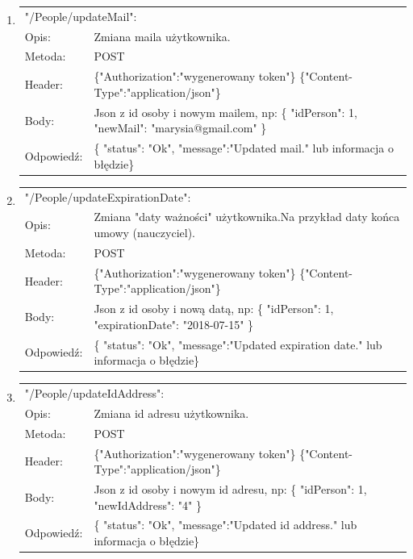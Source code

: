 \documentclass[12pt, titlepage]{article}
\begin{document}
\begin{enumerate}
	\item
	{\renewcommand{\arraystretch}{1.5}
	\begin{tabular}[t]{p{3cm} p{15cm}}
	\multicolumn{2}{l}{"/People/updateMail":} \\
	Opis: & Zmiana maila użytkownika. \\
	Metoda: & POST \\
	Header: & \{"Authorization":"wygenerowany token"\} \newline \{"Content-Type":"application/json"\} \\
	Body: & Json z id osoby i nowym mailem, np: \newline
	\{
	"idPerson": 1,\newline
	"newMail": "marysia@gmail.com"
\}\\
	Odpowiedź: & \{
    "status": "Ok",\newline
    "message":"Updated mail." lub informacja o błędzie\} 
	\end{tabular}}
	
	\item
	{\renewcommand{\arraystretch}{1.5}
	\begin{tabular}[t]{p{3cm} p{15cm}}
	\multicolumn{2}{l}{"/People/updateExpirationDate":} \\
	Opis: & Zmiana "daty ważności" użytkownika.\newline Na przykład daty końca umowy (nauczyciel). \\
	Metoda: & POST \\
	Header: & \{"Authorization":"wygenerowany token"\} \newline \{"Content-Type":"application/json"\} \\
	Body: & Json z id osoby i nową datą, np: \newline
	\{
	"idPerson": 1,\newline
	"expirationDate": "2018-07-15"
\}\\
	Odpowiedź: & \{
    "status": "Ok",\newline
    "message":"Updated expiration date." lub informacja o błędzie\} 
	\end{tabular}}
	
	\item
	{\renewcommand{\arraystretch}{1.5}
	\begin{tabular}[t]{p{3cm} p{15cm}}
	\multicolumn{2}{l}{"/People/updateIdAddress":} \\
	Opis: & Zmiana id adresu użytkownika. \\
	Metoda: & POST \\
	Header: & \{"Authorization":"wygenerowany token"\} \newline \{"Content-Type":"application/json"\} \\
	Body: & Json z id osoby i nowym id adresu, np: \newline
	\{
	"idPerson": 1,\newline
	"newIdAddress": "4"
\}\\
	Odpowiedź: & \{
    "status": "Ok",\newline
    "message":"Updated id address." lub informacja o błędzie\} 
	\end{tabular}}
	

\end{enumerate}
\end{document}
